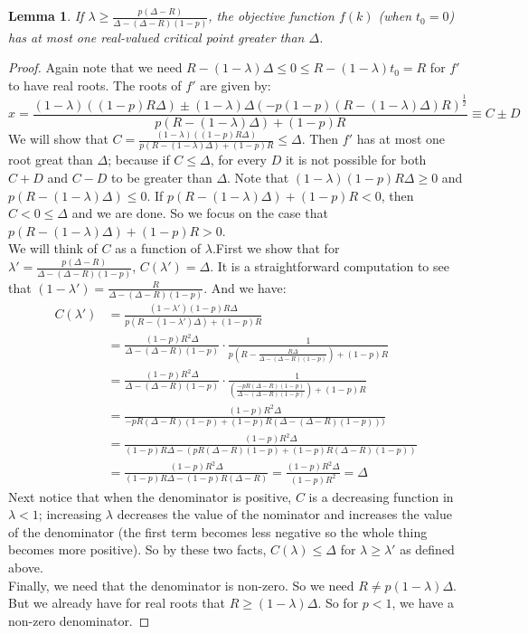 \documentclass{article}
\newtheorem{lemma}{Lemma}[section]
\begin{document}
\begin{lemma} If $\lambda \geq \frac{p(\Delta-R)}{\Delta-(\Delta-R)(1-p)}$, the objective function $f(k)$ (when $t_0 = 0$) has at most one real-valued critical point greater than $\Delta$. \end{lemma}
\begin{proof}
Again note that we need $R-(1-\lambda)\Delta \leq 0 \leq R-(1-\lambda)t_0 = R$ for $f'$ to have real roots. The roots of $f'$ are given by:
\begin{equation*}
x = \frac{(1-\lambda)((1-p)R\Delta) \pm (1-\lambda)\Delta(-p(1-p)(R-(1-\lambda)\Delta)R)^{\frac{1}{2}}}{p(R-(1-\lambda)\Delta)+(1-p)R} \equiv C\pm D
\end{equation*}
We will show that $C = 
\frac{(1-\lambda)((1-p)R\Delta)}{p(R-(1-\lambda)\Delta)+(1-p)R} \leq \Delta$. Then $f'$ has at most one root great than $\Delta$; because if $C \leq \Delta$, for every $D$ it is not possible for both $C+D$ and $C-D$ to be greater than $\Delta$. Note that $(1-\lambda)(1-p)R\Delta \geq 0$ and $p(R-(1-\lambda)\Delta) \leq 0$. If $p(R-(1-\lambda)\Delta)+(1-p)R < 0$, then $C < 0 \leq \Delta$ and we are done. So we focus on the case that $p(R-(1-\lambda)\Delta)+(1-p)R > 0$. \\

We will think of $C$ as a function of $\lambda$.First we show that for $\lambda' = \frac{p(\Delta-R)}{\Delta-(\Delta-R)(1-p)}$, $C(\lambda') = \Delta$. It is a straightforward computation to see that $(1-\lambda') = \frac{R}{\Delta-(\Delta-R)(1-p)}$. And we have:
\begin{align*}
C(\lambda') &= \frac{(1-\lambda')(1-p)R\Delta}{p(R-(1-\lambda')\Delta)+(1-p)R} \\
&= \frac{(1-p)R^2\Delta}{\Delta-(\Delta-R)(1-p)} \cdot \frac{1}{p\left(R-\frac{R\Delta}{\Delta-(\Delta-R)(1-p)} \right)+(1-p)R} \\
&= \frac{(1-p)R^2\Delta}{\Delta-(\Delta-R)(1-p)} \cdot \frac{1}{\left(\frac{-pR(\Delta-R)(1-p)}{\Delta-(\Delta-R)(1-p)} \right)+(1-p)R} \\
&= \frac{(1-p)R^2\Delta}{-pR(\Delta-R)(1-p)+(1-p)R(\Delta-(\Delta-R)(1-p)))} \\
&= \frac{(1-p)R^2\Delta}{(1-p)R\Delta-(pR(\Delta-R)(1-p)+(1-p)R(\Delta-R)(1-p))} \\
&= \frac{(1-p)R^2\Delta}{(1-p)R\Delta-(1-p)R(\Delta-R)} = \frac{(1-p)R^2\Delta}{(1-p)R^2} = \Delta
\end{align*}
Next notice that when the denominator is positive, $C$ is a decreasing function in $\lambda < 1$; increasing $\lambda$ decreases the value of the nominator and increases the value of the denominator (the first term becomes less negative so the whole thing becomes more positive). So by these two facts, $C(\lambda) \leq \Delta$ for $\lambda \geq \lambda'$ as defined above. \\

Finally, we need that the denominator is non-zero. So we need $R \neq p(1-\lambda)\Delta$. But we already have for real roots that $R \geq (1-\lambda)\Delta$. So for $p < 1$, we have a non-zero denominator.
\end{proof}
\end{document}
